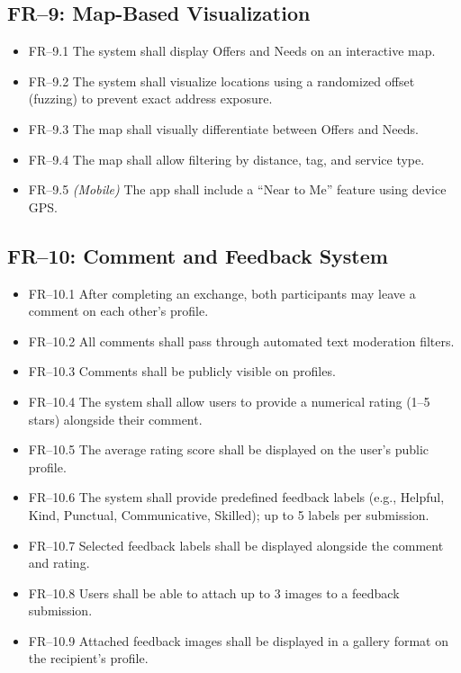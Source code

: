 \documentclass[10pt,a4paper]{report}
\begin{document}
\subsection{FR--9: Map-Based Visualization}
\begin{itemize}
    \item FR--9.1 The system shall display Offers and Needs on an interactive map.
    \item FR--9.2 The system shall visualize locations using a randomized offset (fuzzing) to prevent exact address exposure.
    \item FR--9.3 The map shall visually differentiate between Offers and Needs.
    \item FR--9.4 The map shall allow filtering by distance, tag, and service type.
    \item FR--9.5 \textit{(Mobile)} The app shall include a ``Near to Me'' feature using device GPS.
\end{itemize}

\subsection{FR--10: Comment and Feedback System}
\begin{itemize}
    \item FR--10.1 After completing an exchange, both participants may leave a comment on each other's profile.
    \item FR--10.2 All comments shall pass through automated text moderation filters.
    \item FR--10.3 Comments shall be publicly visible on profiles.
    \item FR--10.4 The system shall allow users to provide a numerical rating (1--5 stars) alongside their comment.
    \item FR--10.5 The average rating score shall be displayed on the user's public profile.
    \item FR--10.6 The system shall provide predefined feedback labels (e.g., Helpful, Kind, Punctual, Communicative, Skilled); up to 5 labels per submission.
    \item FR--10.7 Selected feedback labels shall be displayed alongside the comment and rating.
    \item FR--10.8 Users shall be able to attach up to 3 images to a feedback submission.
    \item FR--10.9 Attached feedback images shall be displayed in a gallery format on the recipient's profile.
\end{itemize}
\end{document}
